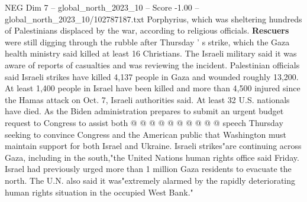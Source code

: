 \begin{textsample}{NEG Dim 7 – global\_north\_2023\_10 – Score -1.00 – global\_north\_2023\_10/102787187.txt}
Porphyrius, which was sheltering hundreds of Palestinians displaced by the war, according to religious officials. \textbf{Rescuers} were still digging through the rubble after Thursday ' s strike, which the Gaza health ministry said killed at least 16 Christians.
The Israeli military said it was aware of reports of casualties and was reviewing the incident.
Palestinian officials said Israeli strikes have killed 4,137 people in Gaza and wounded roughly 13,200.
At least 1,400 people in Israel have been killed and more than 4,500 injured since the Hamas attack on Oct. 7, Israeli authorities said.
At least 32 U.S. nationals have died.
As the Biden administration prepares to submit an urgent budget request to Congress to assist both @ @ @ @ @ @ @ @ @ @ speech Thursday seeking to convince Congress and the American public that Washington must maintain support for both Israel and Ukraine.
Israeli strikes"are continuing across Gaza, including in the south,"the United Nations human rights office said Friday.
Israel had previously urged more than 1 million Gaza residents to evacuate the north.
The U.N. also said it was"extremely alarmed by the rapidly deteriorating human rights situation in the occupied West Bank."

\end{textsample}
